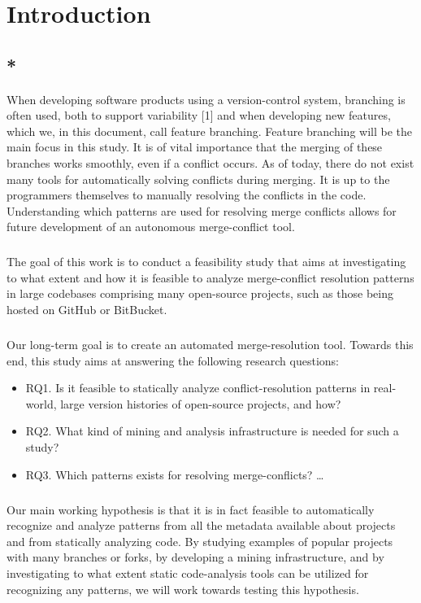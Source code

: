 \chapter{Introduction}

\section{*}
When developing software products using a version-control system, branching is often used, both to support variability [1] and when developing new features, which we, in this document, call feature branching. Feature branching will be the main focus in this study. It is of vital importance that the merging of these branches works smoothly, even if a conflict occurs. As of today, there do not exist many tools for automatically solving conflicts during merging. It is up to the programmers themselves to manually resolving the conflicts in the code. Understanding which patterns are used for resolving merge conflicts allows for future development of an autonomous merge-conflict tool.
\paragraph*{}
The goal of this work is to conduct a feasibility study that aims at investigating to what extent and how it is feasible to analyze merge-conflict resolution patterns in large codebases comprising many open-source projects, such as those being hosted on GitHub or BitBucket.
\paragraph*{}
Our long-term goal is to create an automated merge-resolution tool. Towards this end, this study aims at answering the following research questions:
\begin{itemize}
\item RQ1. Is it feasible to statically analyze conflict-resolution patterns in real-world, large version histories of open-source projects, and how?
\item RQ2. What kind of mining and analysis infrastructure is needed for such a study?
\item RQ3. Which patterns exists for resolving merge-conflicts? \ldots
\end{itemize}
\paragraph*{}
Our main working hypothesis is that it is in fact feasible to automatically recognize and analyze patterns from all the metadata available about projects and from statically analyzing code. By studying examples of popular projects with many branches or forks, by developing a mining infrastructure, and by investigating to what extent static code-analysis tools can be utilized for recognizing any patterns, we will work towards testing this hypothesis.

